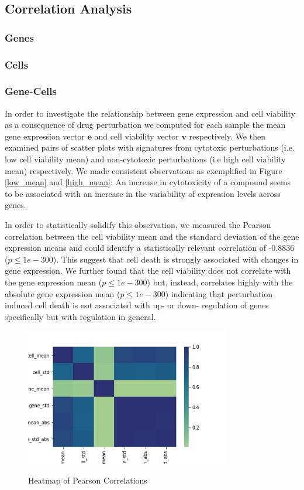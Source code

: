 \documentclass[bsc,frontabs,twoside,singlespacing,parskip,deptreport]{infthesis}     %
\begin{document}
\subsection{Correlation Analysis}
\subsubsection{Genes}
\subsubsection{Cells}
\subsubsection{Gene-Cells}
In order to investigate the relationship between gene expression and cell viability as a consequence of drug perturbation we computed for each sample the mean gene expression vector \(\mathbf{e}\) and cell viability vector \(\mathbf{v}\) respectively. We then examined pairs of scatter plots with signatures from cytotoxic perturbations (i.e. low cell viability mean) and non-cytotoxic perturbations (i.e high cell viability mean) respectively. We made consistent observations as exemplified in Figure \ref{low_mean} and \ref{high_mean}: An increase in cytotoxicity of a compound  seems to be associated with an increase in the variability of expression levels across genes.

In order to statistically solidify this observation, we  measured the Pearson correlation between the cell viability mean and the standard deviation of the gene expression means and could identify a statistically relevant correlation of -0.8836 (\(p\leq1e-300\)). This suggest that cell death is strongly associated with changes in gene expression.
We further found that the cell viability does not correlate with the gene expression mean (\(p\leq1e-300\)) but, instead, correlates highly with the absolute gene expression mean (\(p\leq1e-300\)) indicating that perturbation induced cell death is not associated with up- or down- regulation of genes specifically but with regulation in general. 

\begin{figure}[h!]
\centering
\caption{Heatmap of Pearson Correlations}
\includegraphics[height=6cm]{images/corr_map.png}\label{corr_map}
\end{figure}
\end{document}

